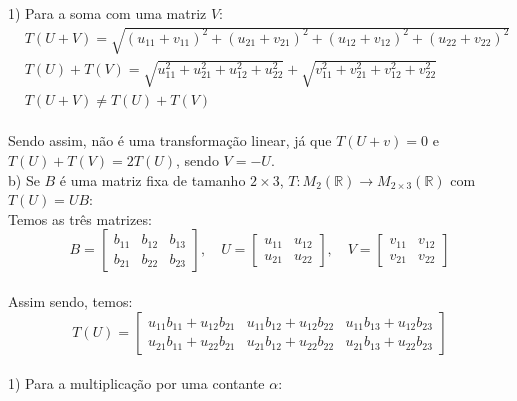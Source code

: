 1) Para a soma com uma matriz $V$:\\

\[
    \begin{split}
        &T(U+V) = \sqrt{(u_{11}+v_{11})^2+(u_{21}+v_{21})^2+(u_{12}+v_{12})^2+(u_{22}+v_{22})^2}\\
        &T(U) + T(V)= \sqrt{u_{11}^2 + u_{21}^2 + u_{12}^2 + u_{22}^2} + \sqrt{v_{11}^2 + v_{21}^2 + v_{12}^2 + v_{22}^2}\\
        &T(U+V)\neq T(U)+T(V)
    \end{split}
\]
\\

Sendo assim, \textcolor{COLOR2}{não é uma transformação linear}, já que $T(U+v)=0$ e $T(U)+T(V) = 2T(U)$, sendo $V=-U$.\\

b) Se $B$ é uma matriz fixa de tamanho $2\times 3$, $T: M_2(\mathbb{R})\to M_{2\times 3}(\mathbb{R})$ com $T(U)=UB$:\\

Temos as três matrizes:\\

\[
    B=\begin{bmatrix}
        b_{11} & b_{12} & b_{13} \\
        b_{21} & b_{22} & b_{23}
    \end{bmatrix}, \quad
    U=\begin{bmatrix}
        u_{11} & u_{12} \\
        u_{21} & u_{22}
    \end{bmatrix}, \quad
    V=\begin{bmatrix}
        v_{11} & v_{12} \\
        v_{21} & v_{22}
    \end{bmatrix}
\]
\\

Assim sendo, temos:\\

\[
    T(U) = \begin{bmatrix}
        u_{11}b_{11} + u_{12}b_{21} & u_{11}b_{12} + u_{12}b_{22} & u_{11}b_{13} + u_{12}b_{23} \\
        u_{21}b_{11} + u_{22}b_{21} & u_{21}b_{12} + u_{22}b_{22} & u_{21}b_{13} + u_{22}b_{23}
    \end{bmatrix}
\]
\\

1) Para a multiplicação por uma contante $\alpha$:
\\

